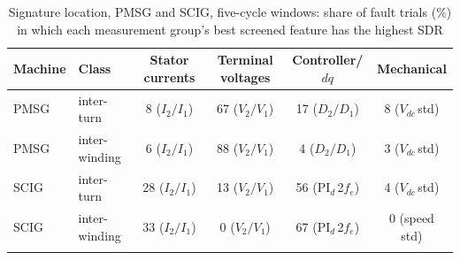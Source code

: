 \begin{table}[t]
\tabsize
\setlength{\tabcolsep}{3pt}
\caption{Signature location, PMSG and SCIG, five-cycle windows: share of fault trials (\%) in which each measurement group's best screened feature has the highest SDR}\label{tab:groups}
\begin{tabular}{@{}llcccc@{}}
\toprule
Machine & Class & Stator currents & Terminal voltages & Controller/$dq$ & Mechanical \\
\midrule
PMSG & inter-turn & 8 ($I_2/I_1$) & 67 ($V_2/V_1$) & 17 ($D_2/D_1$) & 8 ($V_{dc}$\,std) \\
PMSG & inter-winding & 6 ($I_2/I_1$) & 88 ($V_2/V_1$) & 4 ($D_2/D_1$) & 3 ($V_{dc}$\,std) \\
SCIG & inter-turn & 28 ($I_2/I_1$) & 13 ($V_2/V_1$) & 56 (PI$_d$\,2$f_e$) & 4 ($V_{dc}$\,std) \\
SCIG & inter-winding & 33 ($I_2/I_1$) & 0 ($V_2/V_1$) & 67 (PI$_d$\,2$f_e$) & 0 (speed std) \\
\botrule
\end{tabular}
\end{table}
